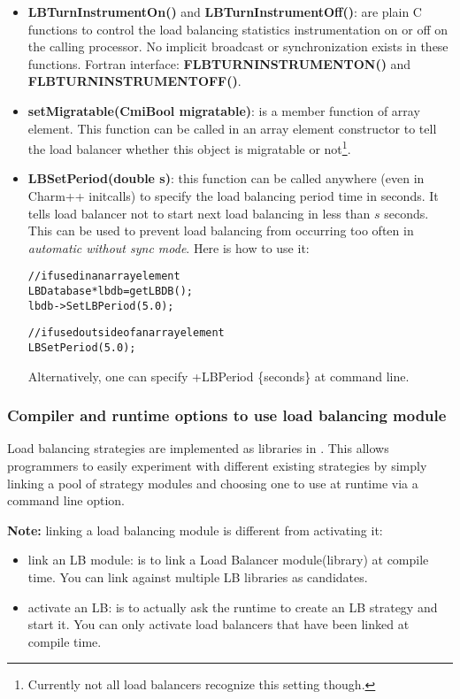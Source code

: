 \begin{itemize}
\item {\bf LBTurnInstrumentOn()} and {\bf LBTurnInstrumentOff()}: are plain C
      functions to control the load balancing statistics instrumentation
      on or off on the calling processor. No implicit broadcast or 
      synchronization exists in these functions.
      Fortran interface: {\bf FLBTURNINSTRUMENTON()} and {\bf FLBTURNINSTRUMENTOFF()}.
\item {\bf setMigratable(CmiBool migratable)}: is a member function of array
      element. This function can be called 
      in an array element constructor to tell the load balancer whether this object
      is migratable or not\footnote{Currently not all load balancers 
      recognize this setting though.}.
\item {\bf LBSetPeriod(double s)}: this function can be called
      anywhere (even in Charm++ initcalls) to specify 
      the load balancing period time in seconds. 
      It tells load balancer not to start next 
      load balancing in less than $s$ seconds. This can be used to prevent 
      load balancing from occurring too often in 
      {\em automatic without sync mode}. Here is how to use it:
      \begin{alltt}
// if used in an array element
LBDatabase *lbdb = getLBDB();
lbdb->SetLBPeriod(5.0);

// if used outside of an array element
LBSetPeriod(5.0);
\end{alltt}
      Alternatively, one can specify +LBPeriod \{seconds\} at command line.
\end{itemize}

\subsubsection{Compiler and runtime options to use load balancing module}

\label{lbOption}

Load balancing strategies are implemented as libraries in \charmpp{}. This
allows programmers to easily experiment with different existing strategies 
by simply linking a pool of strategy modules and choosing
one to use at runtime via a command line option.

{\bf Note:} linking a load balancing module is different from activating it:
\begin{itemize}
\item link an LB module: is to link a Load Balancer module(library) at 
   compile time. You can link against multiple LB libraries as candidates.
\item activate an LB: is to actually ask the runtime to create an LB strategy and 
   start it. You can only activate load balancers that have been linked at
   compile time.
\end{itemize}


